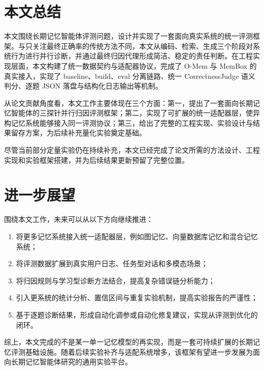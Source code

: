 \section{本文总结}

本文围绕长期记忆智能体评测问题，设计并实现了一套面向真实系统的统一评测框架。与只关注最终正确率的传统方法不同，本文从编码、检索、生成三个阶段对系统行为进行并行诊断，并通过最终归因代理形成简洁、稳定的责任判断。在工程实现层面，本文构建了统一数据契约与适配器协议，完成了 O-Mem 与 MemBox 的真实接入，实现了 baseline、build、eval 分离链路、统一 CorrectnessJudge 语义判分、逐题 JSON 落盘与结构化日志输出等机制。

从论文贡献角度看，本文工作主要体现在三个方面：第一，提出了一套面向长期记忆智能体的三探针并行归因评测框架；第二，实现了可扩展的统一适配器层，使异构记忆系统能够接入同一评测协议；第三，给出了完整的工程实现、实验设计与结果留存方案，为后续补充量化实验奠定基础。

尽管当前部分定量实验仍在持续补充，本文已经完成了论文所需的方法设计、工程实现和实验框架搭建，并为后续结果更新预留了完整位置。

\section{进一步展望}

围绕本文工作，未来可以从以下方向继续推进：

\begin{enumerate}
    \item 将更多记忆系统接入统一适配器层，例如图记忆、向量数据库记忆和混合记忆系统；
    \item 将评测数据扩展到真实用户日志、任务型对话和多模态场景；
    \item 将归因规则与学习型诊断方法结合，提高复杂错误链分析能力；
    \item 引入更系统的统计分析、置信区间与重复实验机制，提高实验报告的严谨性；
    \item 基于逐题诊断结果，形成自动化调参或自动化修复建议，实现从评测到优化的闭环。
\end{enumerate}

综上，本文完成的不是某一单一记忆模型的再实现，而是一套可持续扩展的长期记忆评测基础设施。随着后续实验补齐与适配系统增多，该框架有望进一步发展为面向长期记忆智能体研究的通用实验平台。
